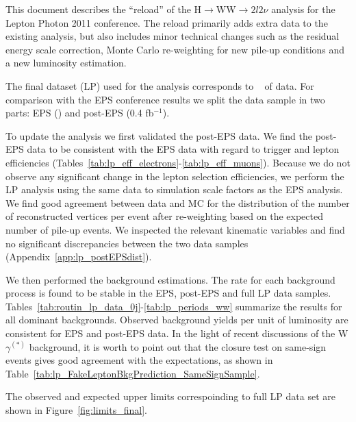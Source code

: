 
This document describes the ``reload'' of the H$\to$WW$\to2l2\nu$
analysis for the Lepton Photon 2011 conference.  The reload primarily
adds extra data to the existing analysis, but also includes minor
technical changes such as the residual energy scale correction, Monte
Carlo re-weighting for new pile-up conditions and a new luminosity
estimation.

The final dataset (LP) used for the analysis corresponds to \lpintlumi~
of data. For comparison with the EPS conference results we split the
data sample in two parts: EPS (\intlumi) and post-EPS (0.4 fb$^{-1}$).

To update the analysis we first validated the post-EPS data. We find
the post-EPS data to be consistent with the EPS data with regard to
trigger and lepton efficiencies
(Tables~\ref{tab:lp_eff_electrons}-\ref{tab:lp_eff_muons}). Because we
do not observe any significant change in the lepton selection
efficiencies, we perform the LP analysis using the same data to
simulation scale factors as the EPS analysis. We find good agreement
between data and MC for the distribution of the number of
reconstructed vertices per event after re-weighting based on the
expected number of pile-up events.  We inspected the relevant
kinematic variables and find no significant discrepancies between the
two data samples (Appendix~\ref{app:lp_postEPSdist}).

We then performed the background estimations. The rate for each
background process is found to be stable in the EPS, post-EPS and full
LP data
samples. Tables~\ref{tab:routin_lp_data_0j}-\ref{tab:lp_periods_ww}
summarize the results for all dominant backgrounds. Observed
background yields per unit of luminosity are consistent for EPS
and post-EPS data. In the light of recent discussions of the
W$\gamma^{(*)}$ background, it is worth to point out that the closure
test on same-sign events gives good agreement with the expectations,
as shown in Table~\ref{tab:lp_FakeLeptonBkgPrediction_SameSignSample}.

The observed and expected upper limits correspoinding to full LP data
set are shown in Figure~\ref{fig:limits_final}.

